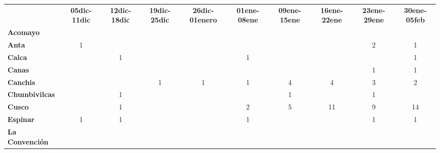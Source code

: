 \begin{tabular}{lccccccccc}
	&\textbf{05dic-11dic}						&\textbf{12dic-18dic}			&\textbf{19dic-25dic}
	&\textbf{26dic-01enero}						&\textbf{01ene-08ene}			&\textbf{09ene-15ene}
	&\textbf{16ene-22ene}						&\textbf{23ene-29ene}			&\textbf{30ene-05feb}\\
	\textbf{Acomayo}                        	
	&\cellcolor[HTML]{FCC46C}                   &\cellcolor[HTML]{FCC46C}  			        &\cellcolor[HTML]{FCC46C}          			&\cellcolor[HTML]{FCC46C} 					&\cellcolor[HTML]{FCC46C} 	    			&\cellcolor[HTML]{FCC46C}				    &\cellcolor[HTML]{FCC46C}
	&\cellcolor[HTML]{FCC46C}					&\cellcolor[HTML]{FCC46C}\\
	\textbf{Anta}                                                          							
	&1											&\cellcolor[HTML]{FCC46C}					
	&\cellcolor[HTML]{FCC46C}					&\cellcolor[HTML]{FCC46C} 
	&\cellcolor[HTML]{FCC46C}					&\cellcolor[HTML]{FCC46C}
	&\cellcolor[HTML]{FCC46C}					&2 				&1\\
	\textbf{Calca}      				       
	&\cellcolor[HTML]{FCC46C} 					&1 								            
	&\cellcolor[HTML]{FCC46C}					&\cellcolor[HTML]{FCC46C} 
	&1											&\cellcolor[HTML]{FCC46C}	&\cellcolor[HTML]{FCC46C}					&\cellcolor[HTML]{FCC46C}
	&1\\                										
	\textbf{Canas}                              
	&\cellcolor[HTML]{FCC46C}       			&\cellcolor[HTML]{FCC46C} 
	&\cellcolor[HTML]{FCC46C} 					&\cellcolor[HTML]{FCC46C} 		&\cellcolor[HTML]{FCC46C}					&\cellcolor[HTML]{FCC46C} 		
	&\cellcolor[HTML]{FCC46C}					&1
	&1\\
	\textbf{Canchis}                            
	&\cellcolor[HTML]{FCC46C}					&\cellcolor[HTML]{FCC46C} 		
	&1											&1
	&1											&4
	&4											&3
	&2\\
	\textbf{Chumbivilcas}                      
	&\cellcolor[HTML]{FCC46C}					&1			
	&\cellcolor[HTML]{FCC46C}					&\cellcolor[HTML]{FCC46C}
	&\cellcolor[HTML]{FCC46C}					&1
	&\cellcolor[HTML]{FCC46C} 					&1
	&\cellcolor[HTML]{FCC46C}\\
	\textbf{Cusco}                             
	&\cellcolor[HTML]{FCC46C}											
	&1								&\cellcolor[HTML]{FCC46C}											
	&\cellcolor[HTML]{FCC46C}					
	&2											&5
	&11											&9 	
	&14 \\
	\textbf{Espinar}       					                 						   
	&1 		 
	&1											&\cellcolor[HTML]{FCC46C}									
	&\cellcolor[HTML]{FCC46C}				    &1
	&\cellcolor[HTML]{FCC46C} 					&\cellcolor[HTML]{FCC46C}
	&1											&1\\
	\textbf{La Convención}                      

\end{tabular}
